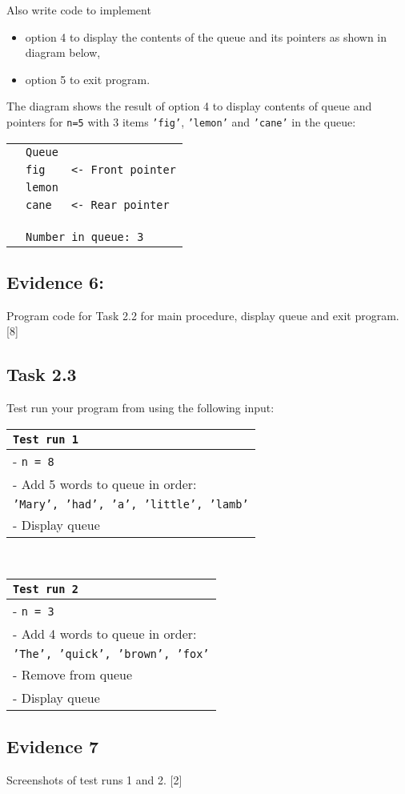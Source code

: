 Also write code to implement 
\begin{itemize}
\item option 4 to display the contents of the queue and its pointers as
shown in diagram below, 
\item option 5 to exit program. 
\end{itemize}
The diagram shows the result of option 4 to display contents of queue
and pointers for \texttt{n=5} with 3 items \texttt{'fig'}, \texttt{'lemon'}
and \texttt{'cane'} in the queue:
\noindent \begin{center}
\begin{tabular}{l|l|l}
\multicolumn{1}{l}{} & \multicolumn{1}{l}{\texttt{Queue}} & \tabularnewline
 & \texttt{fig} & \texttt{<- Front pointer}\tabularnewline
 & \texttt{lemon} & \tabularnewline
 & \texttt{cane} & \texttt{<- Rear pointer}\tabularnewline
 &  & \tabularnewline
 &  & \tabularnewline
\multicolumn{1}{l}{} & \multicolumn{1}{l}{} & \tabularnewline
\multicolumn{1}{l}{} & \multicolumn{2}{l}{\texttt{Number in queue: 3}}\tabularnewline
\end{tabular}
\par\end{center}


\subsection*{Evidence 6:}

Program code for Task 2.2 for main procedure, display queue and exit
program. \hfill{}{[}8{]}

\subsection*{Task 2.3 }

Test run your program from using the following input: 
\noindent \begin{center}
\begin{tabular}{|l|}
\hline 
\texttt{Test run 1}\tabularnewline
\hline 
- \texttt{n = 8}\tabularnewline
- Add 5 words to queue in order:\tabularnewline
\texttt{'Mary', 'had', 'a', 'little', 'lamb'}\tabularnewline
- Display queue\tabularnewline
\hline 
\end{tabular}~~~~~~~~~~~%
\begin{tabular}{|l|}
\hline 
\texttt{Test run 2}\tabularnewline
\hline 
- \texttt{n = 3}\tabularnewline
- Add 4 words to queue in order:\tabularnewline
\texttt{'The', 'quick', 'brown', 'fox'}\tabularnewline
- Remove from queue\tabularnewline
- Display queue\tabularnewline
\hline 
\end{tabular}
\par\end{center}

\subsection*{Evidence 7 }

Screenshots of test runs 1 and 2. \hfill{}{[}2{]}